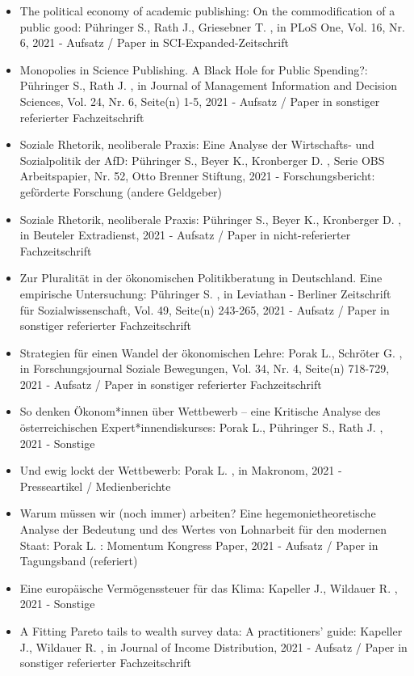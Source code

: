 \begin{itemize}
	 \item The political economy of academic publishing: On the commodification of a public good: Pühringer S., Rath J., Griesebner T. , in PLoS One, Vol. 16, Nr. 6, 2021 - Aufsatz / Paper in SCI-Expanded-Zeitschrift
	 \item Monopolies in Science Publishing. A Black Hole for Public Spending?: Pühringer S., Rath J. , in Journal of Management Information and Decision Sciences, Vol. 24, Nr. 6, Seite(n) 1-5, 2021 - Aufsatz / Paper in sonstiger referierter Fachzeitschrift
	 \item Soziale Rhetorik, neoliberale Praxis: Eine Analyse der Wirtschafts- und Sozialpolitik der AfD: Pühringer S., Beyer K., Kronberger D. , Serie OBS Arbeitspapier, Nr. 52, Otto Brenner Stiftung, 2021 - Forschungsbericht: geförderte Forschung (andere Geldgeber)
	 \item Soziale Rhetorik, neoliberale Praxis: Pühringer S., Beyer K., Kronberger D. , in Beuteler Extradienst, 2021 - Aufsatz / Paper in nicht-referierter Fachzeitschrift
	 \item Zur Pluralität in der ökonomischen Politikberatung in Deutschland. Eine empirische Untersuchung: Pühringer S. , in Leviathan - Berliner Zeitschrift für Sozialwissenschaft, Vol. 49, Seite(n) 243-265, 2021 - Aufsatz / Paper in sonstiger referierter Fachzeitschrift
	 \item Strategien für einen Wandel der ökonomischen Lehre: Porak L., Schröter G. , in Forschungsjournal Soziale Bewegungen, Vol. 34, Nr. 4, Seite(n) 718-729, 2021 - Aufsatz / Paper in sonstiger referierter Fachzeitschrift
	 \item So denken Ökonom*innen über Wettbewerb – eine Kritische Analyse des österreichischen Expert*innendiskurses: Porak L., Pühringer S., Rath J. , 2021 - Sonstige
	 \item Und ewig lockt der Wettbewerb: Porak L. , in Makronom, 2021 - Presseartikel / Medienberichte
	 \item Warum müssen wir (noch immer) arbeiten? Eine hegemonietheoretische Analyse der Bedeutung und des Wertes von Lohnarbeit für den modernen Staat: Porak L. : Momentum Kongress Paper, 2021 - Aufsatz / Paper in Tagungsband (referiert)
	 \item Eine europäische Vermögenssteuer für das Klima: Kapeller J., Wildauer R. , 2021 - Sonstige
	 \item A Fitting Pareto tails to wealth survey data: A practitioners’ guide: Kapeller J., Wildauer R. , in Journal of Income Distribution, 2021 - Aufsatz / Paper in sonstiger referierter Fachzeitschrift

\end{itemize}
